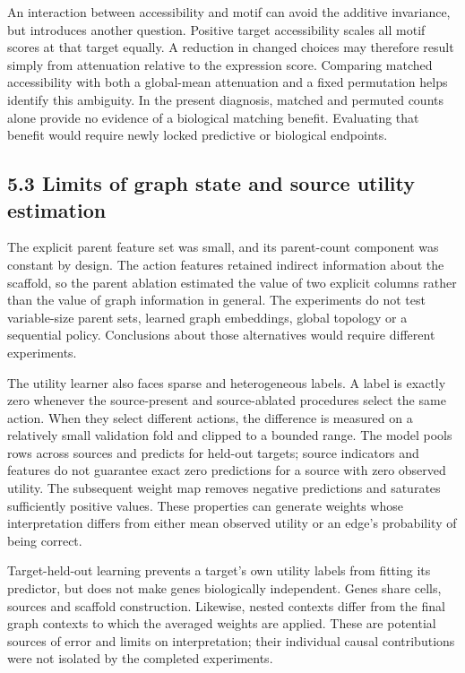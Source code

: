 \documentclass[
  11pt,
]{article}
\begin{document}
An interaction between accessibility and motif can avoid the additive
invariance, but introduces another question. Positive target
accessibility scales all motif scores at that target equally. A
reduction in changed choices may therefore result simply from
attenuation relative to the expression score. Comparing matched
accessibility with both a global-mean attenuation and a fixed
permutation helps identify this ambiguity. In the present diagnosis,
matched and permuted counts alone provide no evidence of a biological
matching benefit. Evaluating that benefit would require newly locked
predictive or biological endpoints.

\subsection{5.3 Limits of graph state and source utility
estimation}\label{limits-of-graph-state-and-source-utility-estimation}

The explicit parent feature set was small, and its parent-count
component was constant by design. The action features retained indirect
information about the scaffold, so the parent ablation estimated the
value of two explicit columns rather than the value of graph information
in general. The experiments do not test variable-size parent sets,
learned graph embeddings, global topology or a sequential policy.
Conclusions about those alternatives would require different
experiments.

The utility learner also faces sparse and heterogeneous labels. A label
is exactly zero whenever the source-present and source-ablated
procedures select the same action. When they select different actions,
the difference is measured on a relatively small validation fold and
clipped to a bounded range. The model pools rows across sources and
predicts for held-out targets; source indicators and features do not
guarantee exact zero predictions for a source with zero observed
utility. The subsequent weight map removes negative predictions and
saturates sufficiently positive values. These properties can generate
weights whose interpretation differs from either mean observed utility
or an edge's probability of being correct.

Target-held-out learning prevents a target's own utility labels from
fitting its predictor, but does not make genes biologically independent.
Genes share cells, sources and scaffold construction. Likewise, nested
contexts differ from the final graph contexts to which the averaged
weights are applied. These are potential sources of error and limits on
interpretation; their individual causal contributions were not isolated
by the completed experiments.
\end{document}
